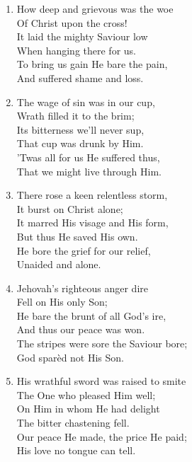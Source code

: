 \begin{enumerate}
    \item How deep and grievous was the woe \\
        Of Christ upon the cross! \\
        It laid the mighty Saviour low \\
        When hanging there for us. \\
        To bring us gain He bare the pain, \\
        And suffered shame and loss.

    \item The wage of sin was in our cup, \\
        Wrath filled it to the brim; \\
        Its bitterness we'll never sup, \\
        That cup was drunk by Him. \\
        'Twas all for us He suffered thus, \\
        That we might live through Him.

    \item There rose a keen relentless storm, \\
        It burst on Christ alone; \\
        It marred His visage and His form, \\
        But thus He saved His own. \\
        He bore the grief for our relief, \\
        Unaided and alone.

    \item Jehovah's righteous anger dire \\
        Fell on His only Son; \\
        He bare the brunt of all God's ire, \\
        And thus our peace was won. \\
        The stripes were sore the Saviour bore; \\
        God spar\`ed not His Son.

    \item His wrathful sword was raised to smite \\
        The One who pleased Him well; \\
        On Him in whom He had delight \\
        The bitter chastening fell. \\
        Our peace He made, the price He paid; \\
        His love no tongue can tell.


\end{enumerate}
